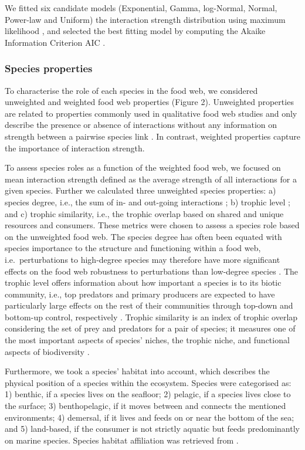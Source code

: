 \documentclass[gc, manuscript]{copernicus}
\begin{document}
We fitted six candidate models (Exponential, Gamma, log-Normal, Normal,
Power-law and Uniform) the interaction strength distribution using
maximum likelihood \citep{McCallum2008}, and selected the best fitting
model by computing the Akaike Information Criterion AIC
\citep{Burnham2002}.

\subsubsection{Species properties}

To characterise the role of each species in the food web, we considered
unweighted and weighted food web properties (Figure 2). Unweighted
properties are related to properties commonly used in qualitative food
web studies and only describe the presence or absence of interactions
without any information on strength between a pairwise species link
\citep{Martinez1991, Dunne2002, Borrelli2014}. In contrast, weighted
properties capture the importance of interaction strength.

To assess species roles as a function of the weighted food web, we
focused on mean interaction strength defined as the average strength of
all interactions for a given species. Further we calculated three
unweighted species properties: a) species degree, i.e., the sum of in-
and out-going interactions ; b) trophic level ; and c) trophic
similarity, i.e., the trophic overlap based on shared and unique
resources and consumers. These metrics were chosen to assess a species
role based on the unweighted food web. The species degree has often been
equated with species importance to the structure and functioning within
a food web, i.e.~perturbations to high-degree species may therefore have
more significant effects on the food web robustness to perturbations
than low-degree species
\citetext{\citealp{Dunne2002a}; \citealp[references
in][]{Cirtwill2018a}}. The trophic level offers information about how
important a species is to its biotic community, i.e., top predators and
primary producers are expected to have particularly large effects on the
rest of their communities through top-down and bottom-up control,
respectively \citep[references in][]{Cirtwill2018a}. Trophic similarity
is an index of trophic overlap considering the set of prey and predators
for a pair of species; it measures one of the most important aspects of
species' niches, the trophic niche, and functional aspects of
biodiversity \citep{Martinez1991, Williams2000}.

Furthermore, we took a species' habitat into account, which describes
the physical position of a species within the ecosystem. Species were
categorised as: 1) benthic, if a species lives on the seafloor; 2)
pelagic, if a species lives close to the surface; 3) benthopelagic, if
it moves between and connects the mentioned environments; 4) demersal,
if it lives and feeds on or near the bottom of the sea; and 5)
land-based, if the consumer is not strictly aquatic but feeds
predominantly on marine species. Species habitat affiliation was
retrieved from \citet{Jacob2011}.
\end{document}
